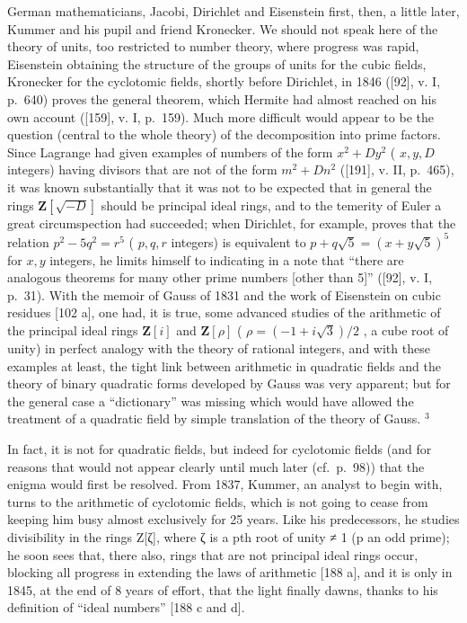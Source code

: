 German mathematicians, Jacobi, Dirichlet and Eisenstein first, then, a little later, Kummer and his pupil and friend Kronecker. We should not speak here of the theory of units, too restricted to number theory, where progress was rapid, Eisenstein obtaining the structure of the groups of units for the cubic fields, Kronecker for the cyclotomic fields, shortly before Dirichlet, in 1846 ({[}92{]}, v. I, p.~640) proves the general theorem, which Hermite had almost reached on his own account ({[}159{]}, v. I, p.~159). Much more difficult would appear to be the question (central to the whole theory) of the decomposition into prime factors. Since Lagrange had given examples of numbers of the form \(x^{2} + Dy^{2}\) ( \(x, y, D\) integers) having divisors that are not of the form \(m^{2} + Dn^{2}\) ({[}191{]}, v. II, p.~465), it was known substantially that it was not to be expected that in general the rings \(\mathbf{Z}[\sqrt{-D}]\) should be principal ideal rings, and to the temerity of Euler a great circumspection had succeeded; when Dirichlet, for example, proves that the relation \(p^{2} - 5q^{2} = r^{5}\) ( \(p, q, r\) integers) is equivalent to \(p + q\sqrt{5} = (x + y\sqrt{5})^{5}\) for \(x, y\) integers, he limits himself to indicating in a note that ``there are analogous theorems for many other prime numbers {[}other than 5{]}'' ({[}92{]}, v. I, p.~31). With the memoir of Gauss of 1831 and the work of Eisenstein on cubic residues {[}102 a{]}, one had, it is true, some advanced studies of the arithmetic of the principal ideal rings \(\mathbf{Z}[i]\) and \(\mathbf{Z}[\rho]\) ( \(\rho = (-1 + i\sqrt{3})/2\) , a cube root of unity) in perfect analogy with the theory of rational integers, and with these examples at least, the tight link between arithmetic in quadratic fields and the theory of binary quadratic forms developed by Gauss was very apparent; but for the general case a ``dictionary'' was missing which would have allowed the treatment of a quadratic field by simple translation of the theory of Gauss. \(^{3}\)

In fact, it is not for quadratic fields, but indeed for cyclotomic fields (and for reasons that would not appear clearly until much later (cf.~p.~98)) that the enigma would first be resolved. From 1837, Kummer, an analyst to begin with, turns to the arithmetic of cyclotomic fields, which is not going to cease from keeping him busy almost exclusively for 25 years. Like his predecessors, he studies divisibility in the rings Z{[}ζ{]}, where ζ is a pth root of unity ≠ 1 (p an odd prime); he soon sees that, there also, rings that are not principal ideal rings occur, blocking all progress in extending the laws of arithmetic {[}188 a{]}, and it is only in 1845, at the end of 8 years of effort, that the light finally dawns, thanks to his definition of ``ideal numbers'' {[}188 c and d{]}.

